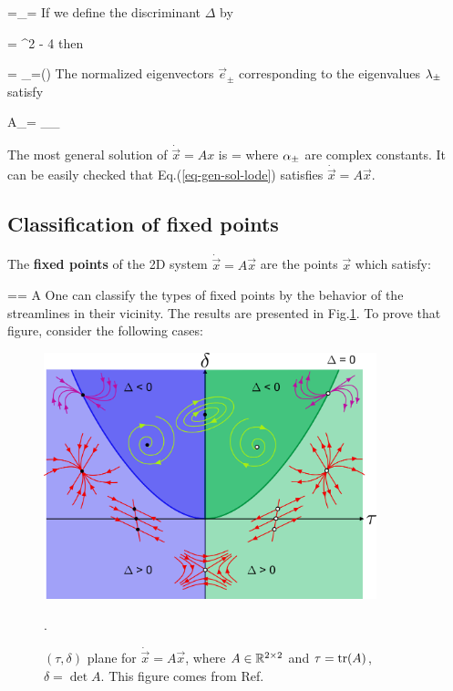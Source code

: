 \beq
\lam =\lam_{\pm}=
\eeq
If we define the discriminant $\Delta$ by

\beq
\Delta = \tau^2 - 4 \delta
\eeq
then

\beq
\lam = \lam_\pm =(\tau\pm \sqrt{\Delta})
\eeq
The normalized eigenvectors $\vec{e}_\pm$ corresponding
to the eigenvalues $\lambda_\pm$ satisfy

\beq 
A_\pm = \lam_{\pm}_\pm
\eeq


The most general solution 
of $\dot{\vec{x}}=A x$ is
\beq
{} = 
\Re{}
\label{eq-gen-sol-lode}
\eeq
where $\alpha_\pm$ are complex constants. It can be easily checked that
Eq.(\ref{eq-gen-sol-lode}) satisfies $\dot{\vec{x}} = A \vec{x}$.

\subsection{Classification of fixed points}

The {\bf fixed points} of the 2D system $\dot{\vec{x}}=A\vec{x}$ are 
the points $\vec{x}$ which satisfy:

== A
\eeq
One can classify the types of fixed points by the behavior
of the streamlines in their vicinity.
The results are 
presented in Fig.\ref{fig-wiki-pp}.
To prove that figure, consider the following cases:


\begin{figure}[h!]
\centering
\includegraphics[width=3.8in]
{dynamical-sys/Phase_plane_nodes.png}
\caption{
$(\tau, \delta)$ plane
for $\dot{\vec{x}} = A \vec{x}$, where $A\in  { \mathbb{R}}^{2\times 2}$ and  $\tau={\rm tr }(A)$, $\delta=\det{A}$. This
figure  comes from Ref.\cite{wiki-phase-plane}}.
\label{fig-wiki-pp}
\end{figure}

